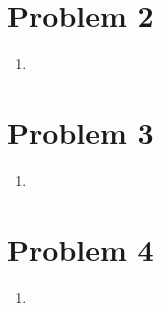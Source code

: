 \documentclass[12pt]{article}
\begin{document}
\section*{Problem 2}
\begin{enumerate}[label=(\alph*)]
    \item 
\end{enumerate}

\section*{Problem 3}
\begin{enumerate}[label=(\alph*)]
    \item 
\end{enumerate}

\section*{Problem 4}
\begin{enumerate}[label=(\alph*)]
    \item 
\end{enumerate}
\end{document}
